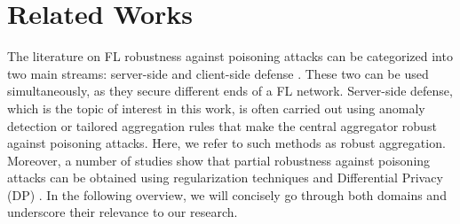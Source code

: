 \section{Related Works}
\label{sec:related_work}
The literature on FL robustness against poisoning attacks can be categorized into two main streams: server-side and client-side defense \cite{pmlr-v202-zhu23j, NEURIPS2021_692baebe, pmlr-v139-xie21a, NIPS2017_f4b9ec30, 291249}. These two can be used simultaneously, as they secure different ends of a FL network. Server-side defense, which is the topic of interest in this work, is often carried out using anomaly detection or tailored aggregation rules that make the central aggregator robust against poisoning attacks. Here, we refer to such methods as robust aggregation. Moreover, a number of studies show that partial robustness against poisoning attacks can be obtained using regularization techniques and Differential Privacy (DP) \cite{sun2019really, naseri2022local}.
In the following overview, we will concisely go through both domains and underscore their relevance to our research.




